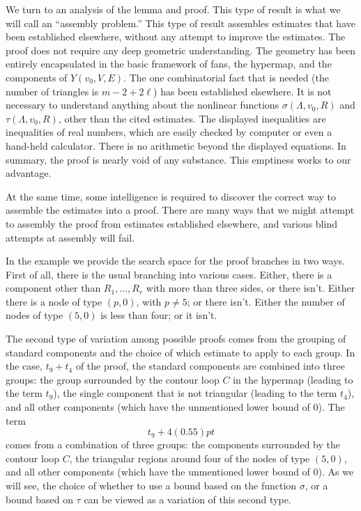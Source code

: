 We turn to an analysis of the lemma and proof.  This type of result is what
we will call an ``assembly problem.''  This type of result
assembles estimates that have been established elsewhere, without
any attempt to improve the estimates.  The proof
does not require any deep geometric understanding.  The geometry
has been entirely encapsulated in the basic framework of
fans, the hypermap, and the components
of $Y(v_0,V,E)$.  The one combinatorial fact that is needed
(the number of triangles is $m-2+2\ell$) 
has been established elsewhere.  It is not necessary
to understand anything about the nonlinear functions $\sigma(\Lambda,v_0,R)$
and $\tau(\Lambda,v_0,R)$, other than the cited estimates.   
The displayed inequalities are inequalities of real numbers,
which are easily checked by computer
or even a hand-held calculator.  There is no arithmetic beyond
the displayed equations.
In summary,
the proof is nearly void of any substance.   This emptiness
works to our advantage.

At the same time, some intelligence is required to discover the
correct way to assemble the estimates into a proof.   There are
many ways that we might attempt to assembly the proof from estimates
established elsewhere, and various blind attempts at assembly will
fail.  

In the example we provide the search space for the proof
branches in two ways.  First of all, there is the usual branching
into various cases.  Either, there is a component other than
$R_1,\ldots,R_r$ with more than three sides, or there isn't.
Either there is a node of type $(p,0)$, with $p\ne 5$; or there isn't.
Either the number of nodes of type $(5,0)$ is less than four; or it isn't.

The second type of variation among possible proofs comes from
the grouping of standard components and the choice of which estimate
to apply to each group.  In the case, $t_9+t_4$ of the proof, the
standard components are combined into three groups:
the group surrounded by the contour loop $C$ in the hypermap
(leading to the term $t_9$), the single component that is not triangular
(leading to the term $t_4$), and all other components (which have
the unmentioned lower bound of $0$).  The term
   $$
   t_9 + 4(0.55)pt 
   $$
comes from a combination of three groups:
the components surrounded by the contour loop $C$, the triangular
regions around four of the nodes of type $(5,0)$, and all other
components (which have the unmentioned lower bound of $0$).
As we will see, the choice of whether to use a bound based on
the function $\sigma$, or a bound based on $\tau$ can be
viewed as a variation of this second type.

